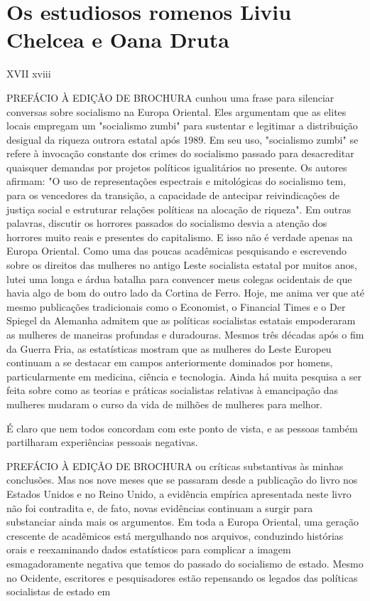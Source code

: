 \section{Os estudiosos romenos Liviu Chelcea e Oana Druta}
 \par 
XVII xviii
 \par 
PREFÁCIO À EDIÇÃO DE BROCHURA cunhou uma frase para silenciar conversas sobre socialismo na Europa Oriental. Eles argumentam que as elites locais empregam um "socialismo zumbi" para sustentar e legitimar a distribuição desigual da riqueza outrora estatal após 1989. Em seu uso, "socialismo zumbi" se refere à invocação constante dos crimes do socialismo passado para desacreditar quaisquer demandas por projetos políticos igualitários no presente. Os autores afirmam: "O uso de representações espectrais e mitológicas do socialismo tem, para os vencedores da transição, a capacidade de antecipar reivindicações de justiça social e estruturar relações políticas na alocação de riqueza". Em outras palavras, discutir os horrores passados ​​do socialismo desvia a atenção dos horrores muito reais e presentes do capitalismo. E isso não é verdade apenas na Europa Oriental. Como uma das poucas acadêmicas pesquisando e escrevendo sobre os direitos das mulheres no antigo Leste socialista estatal por muitos anos, lutei uma longa e árdua batalha para convencer meus colegas ocidentais de que havia algo de bom do outro lado da Cortina de Ferro. Hoje, me anima ver que até mesmo publicações tradicionais como o Economist, o Financial Times e o Der Spiegel da Alemanha admitem que as políticas socialistas estatais empoderaram as mulheres de maneiras profundas e duradouras. Mesmos três décadas após o fim da Guerra Fria, as estatísticas mostram que as mulheres do Leste Europeu continuam a se destacar em campos anteriormente dominados por homens, particularmente em medicina, ciência e tecnologia. Ainda há muita pesquisa a ser feita sobre como as teorias e práticas socialistas relativas à emancipação das mulheres mudaram o curso da vida de milhões de mulheres para melhor.
 \par 
É claro que nem todos concordam com este ponto de vista, e as pessoas também partilharam experiências pessoais negativas.
 \par 
PREFÁCIO À EDIÇÃO DE BROCHURA ou críticas substantivas às minhas conclusões. Mas nos nove meses que se passaram desde a publicação do livro nos Estados Unidos e no Reino Unido, a evidência empírica apresentada neste livro não foi contradita e, de fato, novas evidências continuam a surgir para substanciar ainda mais os argumentos. Em toda a Europa Oriental, uma geração crescente de acadêmicos está mergulhando nos arquivos, conduzindo histórias orais e reexaminando dados estatísticos para complicar a imagem esmagadoramente negativa que temos do passado do socialismo de estado. Mesmo no Ocidente, escritores e pesquisadores estão repensando os legados das políticas socialistas de estado em
